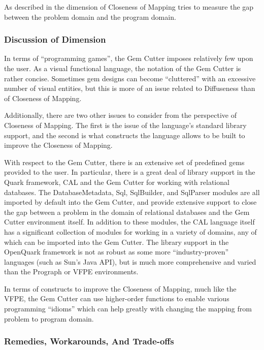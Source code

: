 As described in  the dimension of Closeness of Mapping tries to measure the gap between the problem domain and the program domain. 

\subsubsection{Discussion of Dimension}

In terms of ``programming games'', the Gem Cutter imposes relatively few upon the user.  As a visual functional language, the notation of the Gem Cutter is rather concise.  Sometimes gem designs can become ``cluttered'' with an excessive number of visual entities, but this is more of an issue related to Diffuseness than of Closeness of Mapping.

Additionally, there are two other issues to consider from the perspective of Closeness of Mapping.  The first is the issue of the language's standard library support, and the second is what constructs the language allows to be built to improve the Closeness of Mapping.

With respect to the Gem Cutter, there is an extensive set of predefined gems provided to the user.  In particular, there is a great deal of library support in the Quark framework, CAL and the Gem Cutter for working with relational databases.  The DatabaseMetadata, Sql, SqlBuilder, and SqlParser modules are all imported by default into the Gem Cutter, and provide extensive support to close the gap between a problem in the domain of relational databases and the Gem Cutter environment itself.  In addition to these modules, the CAL language itself has a significant collection of modules for working in a variety of domains, any of which can be imported into the Gem Cutter.  The library support in the OpenQuark framework is not as robust as some more ``industry-proven'' languages (such as Sun's Java API), but is much more comprehensive and varied than the Prograph or VFPE environments.  

In terms of constructs to improve the Closeness of Mapping, much like the VFPE, the Gem Cutter can use higher-order functions to enable various programming ``idioms'' which can help greatly with changing the mapping from problem to program domain.

\subsubsection{Remedies, Workarounds, And Trade-offs}

